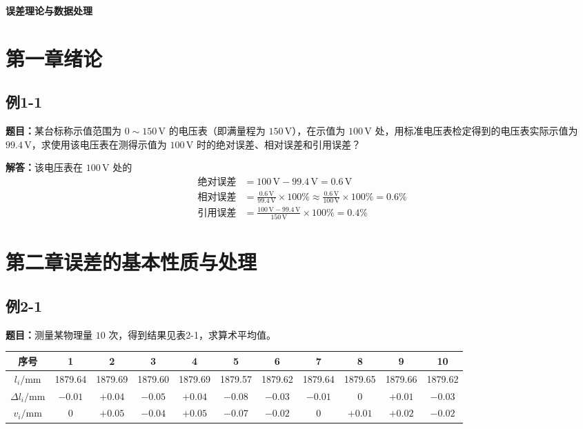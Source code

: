 \documentclass[UTF8,zihao=-4]{ctexart}
\newcommand{\problem}[1]{\subsection*{#1}}
\newcommand{\timu}{\noindent\textbf{题目：}}
\newcommand{\jieda}{\noindent\textbf{解答：}}
\begin{document}
\begin{center}
    {\LARGE \textbf{误差理论与数据处理}}
\end{center}

\section*{第一章\quad 绪论}
\problem{例1-1}

\timu 某台标称示值范围为 $0\sim150\,\mathrm{V}$ 的电压表（即满量程为 $150\,\mathrm{V}$），在示值为 $100\,\mathrm{V}$ 处，用标准电压表检定得到的电压表实际示值为 $99.4\,\mathrm{V}$，求使用该电压表在测得示值为 $100\,\mathrm{V}$ 时的绝对误差、相对误差和引用误差？

\jieda 该电压表在 $100\,\mathrm{V}$ 处的
\begin{equation*}
\begin{aligned}
    \text{绝对误差}
    &=100\,\mathrm{V}-99.4\,\mathrm{V}
    =0.6\,\mathrm{V}\\
    \text{相对误差}
    &=
    \frac{0.6\,\mathrm{V}}{99.4\,\mathrm{V}}\times100\%
    \approx
    \frac{0.6\,\mathrm{V}}{100\,\mathrm{V}}\times100\%
    =0.6\%\\
    \text{引用误差}
    &=
    \frac{100\,\mathrm{V}-99.4\,\mathrm{V}}{150\,\mathrm{V}}\times100\%
    =0.4\%
\end{aligned}
\end{equation*}

\section*{第二章\quad 误差的基本性质与处理}

\problem{例2-1}
\timu 测量某物理量 $10$ 次，得到结果见表2-1，求算术平均值。

\begin{center}
\scriptsize
\setlength{\tabcolsep}{7pt}
\begin{tabular}{c|cccccccccc}
\toprule
序号 & 1 & 2 & 3 & 4 & 5 & 6 & 7 & 8 & 9 & 10\\
\midrule
$l_i/\mathrm{mm}$ & 1879.64 & 1879.69 & 1879.60 & 1879.69 & 1879.57 & 1879.62 & 1879.64 & 1879.65 & 1879.66 & 1879.62\\
$\Delta l_i/\mathrm{mm}$ & $-0.01$ & $+0.04$ & $-0.05$ & $+0.04$ & $-0.08$ & $-0.03$ & $-0.01$ & 0 & $+0.01$ & $-0.03$\\
$v_i/\mathrm{mm}$ & 0 & $+0.05$ & $-0.04$ & $+0.05$ & $-0.07$ & $-0.02$ & 0 & $+0.01$ & $+0.02$ & $-0.02$\\
\bottomrule
\end{tabular}
\end{center}
\end{document}
